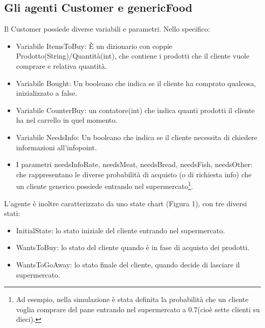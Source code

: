 \documentclass{article}
\begin{document}
\subsection{Gli agenti Customer e genericFood}
Il \textsf{Customer} possiede diverse variabili e parametri. Nello specifico:
\begin{itemize}
\item Variabile \textsf{ItemsToBuy}: È un dizionario con coppie Prodotto(String)/Quantità(int), che contiene i prodotti che il cliente vuole comprare e relativa quantità.
\item Variabile \textsf{Bought}: Un booleano che indica se il cliente ha comprato qualcosa, inizializzato a false.
\item Variabile \textsf{CounterBuy}: un contatore(int) che indica quanti prodotti il cliente ha nel carrello in quel momento.
\item Variabile \textsf{NeedsInfo}: Un booleano che indica se il cliente necessita di chiedere informazioni all'infopoint.
\item I parametri \textsf{needsInfoRate}, \textsf{needsMeat}, \textsf{needsBread}, \textsf{needsFish}, \textsf{needsOther}: che rappresentano le diverse probabilità di acquisto (o di richiesta info) che un cliente generico possiede entrando nel supermercato\footnote{Ad esempio, nella simulazione è stata definita la probabilità che un cliente  voglia comprare del pane entrando nel supermercato a 0.7(cioè sette clienti su dieci).}.
\end{itemize}
L'agente è inoltre caratterizzato da uno state chart (Figura 1), con tre diversi stati:
\begin{itemize}
\item \textsf{InitialState}: lo stato iniziale del cliente entrando nel supermercato.
\item \textsf{WantsToBuy}: lo stato del cliente quando è in fase di acquisto dei prodotti.
\item \textsf{WantsToGoAway}: lo stato finale del cliente, quando decide di lasciare il supermercato.
\end{itemize}
\end{document}
